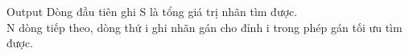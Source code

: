 Output
Dòng đầu tiên ghi S là tổng giá trị nhãn tìm được.
\\N dòng tiếp theo, dòng thứ i ghi nhãn gán cho đỉnh i trong phép gán tối ưu tìm được.